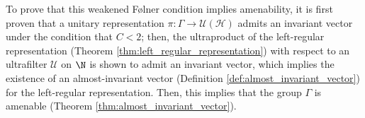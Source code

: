 To prove that this weakened Følner condition implies amenability, it is first proven that a unitary representation $\pi\colon \Gamma\rightarrow \mathcal{U}\left( \mathcal{H} \right)$ admits an invariant vector under the condition that $C < 2$; then, the ultraproduct of the left-regular representation (Theorem \ref{thm:left_regular_representation}) with respect to an ultrafilter $\mathcal{U}$ on $\N$ is shown to admit an invariant vector, which implies the existence of an almost-invariant vector (Definition \ref{def:almost_invariant_vector}) for the left-regular representation. Then, this implies that the group $\Gamma$ is amenable (Theorem \ref{thm:almost_invariant_vector}).

